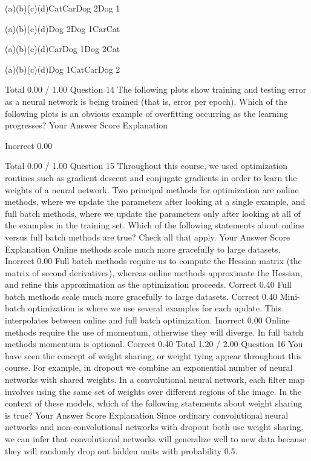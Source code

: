 (a)(b)(c)(d)CatCarDog 2Dog 1 


(a)(b)(c)(d)Dog 2Dog 1CarCat 


(a)(b)(c)(d)CarDog 1Dog 2Cat 


(a)(b)(c)(d)Dog 1CatCarDog 2 

Total		0.00 / 1.00	
Question 14
The following plots show training and testing error as a neural network is being trained (that is, error per epoch). Which of the following plots is an obvious example of overfitting occurring as the learning progresses?
Your Answer		Score	Explanation
			
	Inorrect	0.00	
			
Total		0.00 / 1.00	
Question 15
Throughout this course, we used optimization routines such as gradient descent and conjugate gradients in order to learn the weights of a neural network. Two principal methods for optimization are online methods, where we update the parameters after looking at a single example, and full batch methods, where we update the parameters only after looking at all of the examples in the training set. Which of the following statements about online versus full batch methods are true? Check all that apply.
Your Answer		Score	Explanation
Online methods scale much more gracefully to large datasets.	Inorrect	0.00	
Full batch methods require us to compute the Hessian matrix (the matrix of second derivatives), whereas online methods approximate the Hessian, and refine this approximation as the optimization proceeds.	Correct	0.40	
Full batch methods scale much more gracefully to large datasets.	Correct	0.40	
Mini-batch optimization is where we use several examples for each update. This interpolates between online and full batch optimization.	Inorrect	0.00	
Online methods require the use of momentum, otherwise they will diverge. In full batch methods momentum is optional.	Correct	0.40	
Total		1.20 / 2.00	
Question 16
You have seen the concept of weight sharing, or weight tying appear throughout this course. For example, in dropout we combine an exponential number of neural networks with shared weights. In a convolutional neural network, each filter map involves using the same set of weights over different regions of the image. In the context of these models, which of the following statements about weight sharing is true?
Your Answer		Score	Explanation
Since ordinary convolutional neural networks and non-convolutional networks with dropout both use weight sharing, we can infer that convolutional networks will generalize well to new data because they will randomly drop out hidden units with probability 0.5.			
